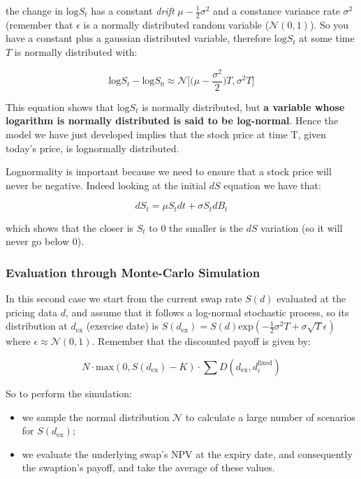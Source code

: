 \documentclass[11pt]{article}
\providecommand{\tightlist}{%
      \setlength{\itemsep}{0pt}\setlength{\parskip}{0pt}}
\begin{document}
the change in \(\textrm{log} S_t\) has a constant \emph{drift}
\(\mu - \frac{1}{2}\sigma^2\) and a constance variance rate \(\sigma^2\)
(remember that \(\epsilon\) is a normally distributed random variable
(\(\mathcal{N}(0,1)\)). So you have a constant plus a gaussian
distributed variable, therefore \(\textrm{log} S_t\) at some time \(T\)
is normally distributed with:

\[\textrm{log}S_t - \textrm{log}S_0 \approx\mathcal{N}\big[\big(\mu-\frac{\sigma^2}{2}\big)T, \sigma^2 T\big]\]

This equation shows that \(\textrm{log}S_t\) is normally distributed,
but \textbf{a variable whose logarithm is normally distributed is said
to be log-normal}. Hence the model we have just developed implies that
the stock price at time T, given today's price, is lognormally
distributed.

Lognormality is important because we need to ensure that a stock price
will never be negative. Indeed looking at the initial \(dS\) equation we
have that:

\[dS_t = \mu S_tdt + \sigma S_tdB_t\]

which shows that the closer is \(S_t\) to 0 the smaller is the \(dS\)
variation (so it will never go below 0).

\subsubsection{Evaluation through Monte-Carlo
Simulation}\label{evaluation-through-monte-carlo-simulation}

In this second case we start from the current swap rate \(S(d)\)
evaluated at the pricing data \(d\), and assume that it follows a
log-normal stochastic process, so its distribution at
\(d_{\mathrm{ex}}\) (exercise date) is
\(S(d_{\mathrm{ex}}) = S(d)\mathrm{exp}(-\frac{1}{2}\sigma^{2}T+\sigma\sqrt{T}\epsilon)\)
where \(\epsilon\approx\mathcal{N}(0,1)\). Remember that the discounted
payoff is given by:

\[N\cdot \mathrm{max}(0, S(d_{\mathrm{ex}}) - K)\cdot\sum D(d_{\mathrm{ex}}, d_i^{\mathrm{fixed}})\]

So to perform the simulation:

\begin{itemize}
\tightlist
\item
  we sample the normal distribution \(\mathcal{N}\) to calculate a large
  number of scenarios for \(S(d_{\mathrm{ex}})\);
\item
  we evaluate the underlying swap's NPV at the expiry date, and
  consequently the swaption's payoff, and take the average of these
  values.
\end{itemize}
\end{document}
